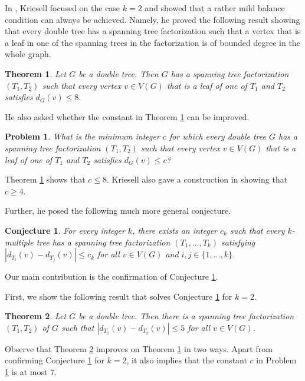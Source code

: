 \documentclass{article}
\theoremstyle{plain}
\newtheorem{Theorem}{Theorem}
\newtheorem{Problem}{Problem}
\newtheorem{Conjecture}{Conjecture}
\theoremstyle{nonumberplain}
\theoremstyle{nonumberplain}
\newcommand{\stf}{spanning tree factorization }
\begin{document}
In \cite{nk1}, Kriesell focused on the case $k=2$ and showed that a rather mild balance condition can always be achieved. Namely, he proved the following result showing that every double tree has a \stf such that a vertex that is  a leaf in one of the spanning trees in the factorization is of bounded degree in the whole graph. 
\begin{Theorem} \cite{nk1}\label{feuille}
Let $G$ be a double tree. Then $G$ has a \stf $(T_1,T_2)$ such that every vertex $v \in V(G)$ that is a leaf of one of $T_1$ and $T_2$ satisfies $d_G(v)\leq 8$. 
\end{Theorem} 
He also asked whether the constant in Theorem \ref{feuille} can be improved.

\begin{Problem}\cite{nk1} \label{dggfd}
What is the minimum integer $c$ for which every double tree $G$ has a \stf $(T_1,T_2)$ such that every vertex $v \in V(G)$ that is a leaf of one of $T_1$ and $T_2$ satisfies $d_G(v)\leq c$?
\end{Problem}

Theorem \ref{feuille} shows that $c \leq 8$. Kriesell also gave a construction in \cite{nk1} showing that $c \geq 4$.

Further, he posed the following much more general conjecture.

\begin{Conjecture}\cite{nk1} \label{ddfd}
For every integer $k$, there exists an integer $c_k$ such that every $k$-multiple tree has a \stf $(T_1,\ldots,T_k)$ satisfying $|d_{T_i}(v)-d_{T_j}(v)|\leq c_k$ for all $v \in V(G)$ and $i,j \in \{1,\ldots,k\}$.
\end{Conjecture}

Our main contribution is the confirmation of Conjecture \ref{ddfd}.
\medskip

 First, we show the following result that solves Conjecture \ref{ddfd} for $k=2$.

\begin{Theorem}\label{main}
Let $G$ be a double tree. Then there is a spanning tree factorization $(T_1,T_2)$ of $G$ such that $|d_{T_1}(v)-d_{T_2}(v)|\leq 5$ for all $v \in V(G)$.
\end{Theorem}

Observe that Theorem \ref{main} improves on Theorem \ref{feuille} in two ways. Apart from confirming Conjecture \ref{ddfd} for $k=2$, it also implies that the constant $c$ in Problem \ref{dggfd} is at most 7.
\end{document}
